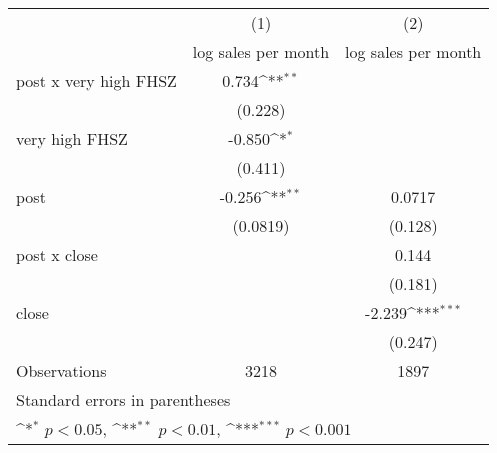 {
\def\sym#1{\ifmmode^{#1}\else\(^{#1}\)\fi}
\begin{tabular}{l*{2}{c}}
\hline\hline
                    &\multicolumn{1}{c}{(1)}&\multicolumn{1}{c}{(2)}\\
                    &\multicolumn{1}{c}{log sales per month}&\multicolumn{1}{c}{log sales per month}\\
\hline
post x very high FHSZ&       0.734\sym{**} &                     \\
                    &     (0.228)         &                     \\
[1em]
very high FHSZ      &      -0.850\sym{*}  &                     \\
                    &     (0.411)         &                     \\
[1em]
post                &      -0.256\sym{**} &      0.0717         \\
                    &    (0.0819)         &     (0.128)         \\
[1em]
post x close        &                     &       0.144         \\
                    &                     &     (0.181)         \\
[1em]
close               &                     &      -2.239\sym{***}\\
                    &                     &     (0.247)         \\
\hline
Observations        &        3218         &        1897         \\
\hline\hline
\multicolumn{3}{l}{\footnotesize Standard errors in parentheses}\\
\multicolumn{3}{l}{\footnotesize \sym{*} \(p<0.05\), \sym{**} \(p<0.01\), \sym{***} \(p<0.001\)}\\
\end{tabular}
}
